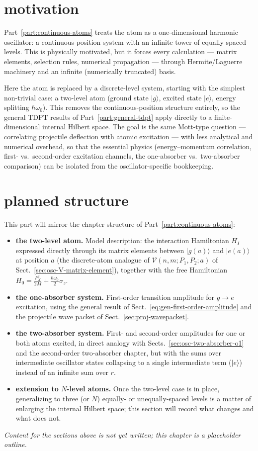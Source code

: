 \section{motivation}

Part~\ref{part:continuous-atoms} treats the atom as a one-dimensional harmonic oscillator: a continuous-position system with an infinite tower of equally spaced levels. This is physically motivated, but it forces every calculation --- matrix elements, selection rules, numerical propagation --- through Hermite/Laguerre machinery and an infinite (numerically truncated) basis.

Here the atom is replaced by a discrete-level system, starting with the simplest non-trivial case: a two-level atom (ground state $|g\rangle$, excited state $|e\rangle$, energy splitting $\hbar\omega_0$). This removes the continuous-position structure entirely, so the general TDPT results of Part~\ref{part:general-tdpt} apply directly to a finite-dimensional internal Hilbert space. The goal is the same Mott-type question --- correlating projectile deflection with atomic excitation --- with less analytical and numerical overhead, so that the essential physics (energy--momentum correlation, first- vs.\ second-order excitation channels, the one-absorber vs.\ two-absorber comparison) can be isolated from the oscillator-specific bookkeeping.

\section{planned structure}

This part will mirror the chapter structure of Part~\ref{part:continuous-atoms}:

\begin{itemize}
  \item \textbf{the two-level atom.} Model description: the interaction Hamiltonian $H_I$ expressed directly through its matrix elements between $|g(a)\rangle$ and $|e(a)\rangle$ at position $a$ (the discrete-atom analogue of $\mathcal V(n,m;P_1,P_2;a)$ of Sect.~\ref{sec:osc-V-matrix-element}), together with the free Hamiltonian $H_0=\frac{P_X^2}{2M}+\frac{\hbar\omega_0}{2}\sigma_z$.
  \item \textbf{the one-absorber system.} First-order transition amplitude for $g\to e$ excitation, using the general result of Sect.~\ref{eq:gen-first-order-amplitude} and the projectile wave packet of Sect.~\ref{sec:proj-wavepacket}.
  \item \textbf{the two-absorber system.} First- and second-order amplitudes for one or both atoms excited, in direct analogy with Sects.~\ref{sec:osc-two-absorber-o1} and the second-order two-absorber chapter, but with the sums over intermediate oscillator states collapsing to a single intermediate term ($|e\rangle$) instead of an infinite sum over $r$.
  \item \textbf{extension to $N$-level atoms.} Once the two-level case is in place, generalizing to three (or $N$) equally- or unequally-spaced levels is a matter of enlarging the internal Hilbert space; this section will record what changes and what does not.
\end{itemize}

\textit{Content for the sections above is not yet written; this chapter is a placeholder outline.}
